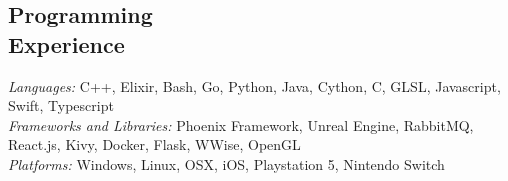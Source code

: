 \documentclass[margin,line]{resume}
\begin{document}
\begin{resume}
    \section{\mysidestyle Programming\\Experience}

    \emph{Languages:} C++, Elixir, Bash, Go, Python, Java, Cython, C, GLSL, Javascript, Swift, Typescript \\
    \emph{Frameworks and Libraries:} Phoenix Framework, Unreal Engine, RabbitMQ, React.js, Kivy, Docker, Flask, WWise, OpenGL \\
    \emph{Platforms:} Windows, Linux, OSX, iOS, Playstation 5, Nintendo Switch \\

\end{resume}
\end{document}

